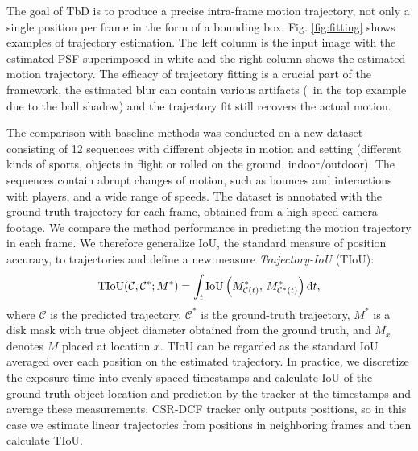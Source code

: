 \documentclass[10pt,twocolumn,letterpaper]{article}
\begin{document}
The goal of TbD is to produce a precise intra-frame motion trajectory, not only a single position per frame in the form of a bounding box. Fig. \ref{fig:fitting} shows examples of trajectory estimation.
The left column is the input image with the estimated PSF superimposed in white and the right column shows the estimated motion trajectory. The efficacy of trajectory fitting is a crucial part of the framework, the estimated blur can contain various artifacts (\eg~in the top example due to the ball shadow) and the trajectory fit still recovers the actual motion.

The comparison with baseline methods was conducted on a new dataset consisting of 12 sequences with different objects in motion and setting (different kinds of sports, objects in flight or rolled on the ground, indoor/outdoor). The sequences contain abrupt changes of motion, such as bounces and interactions with players, and a wide range of speeds.
The dataset is annotated with the ground-truth trajectory for each frame, obtained from  a high-speed camera footage.
We compare the method performance in predicting the motion trajectory in each frame. We therefore generalize IoU, the standard measure of position accuracy, to trajectories and define a new measure \emph{Trajectory-IoU} (TIoU):
\begin{equation}
	\label{eq:exp_TIoU_def}
	\operatorname{TIoU}(\mathcal{C},\mathcal{C}^*; M^*) = \int_{t} \operatorname{IoU}\left(\rule{0pt}{2ex}M^*_{\mathcal{C}(t)},\, M^*_{\mathcal{C}^*(t)}\right)\mathrm{d}t,
\end{equation}
where $\mathcal{C}$ is the predicted trajectory, $\mathcal{C}^*$ is the ground-truth trajectory, $M^*$ is a disk mask with true object diameter obtained from the ground truth, and $M_x$ denotes $M$ placed at location $x$. TIoU can be regarded as the standard IoU averaged over each position on the estimated trajectory. In practice, we discretize the exposure time into evenly spaced timestamps and calculate IoU of the ground-truth object location and prediction by the tracker at the timestamps and average these measurements. CSR-DCF tracker only outputs positions, so in this case we estimate linear trajectories from positions in neighboring frames and then calculate TIoU.
\end{document}
